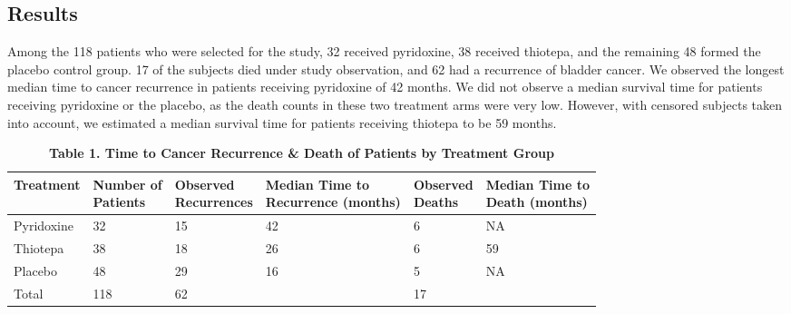 \documentclass{article}
\begin{document}
	\subsection*{Results}
	Among the 118 patients who were selected for the study, 32 received pyridoxine, 38 received thiotepa, and the remaining 48 formed the placebo control group. 17 of the subjects died under study observation, and 62 had a recurrence of bladder cancer. We observed the longest median time to cancer recurrence in patients receiving pyridoxine of 42 months. We did not observe a median survival time for patients receiving pyridoxine or the placebo, as the death counts in these two treatment arms were very low. However, with censored subjects taken into account, we estimated a median survival time for patients receiving thiotepa to be 59 months.

	\begin{table}[ht]
		\centering
		\footnotesize
		\caption*{\textbf{Table 1. Time to Cancer Recurrence \& Death of Patients by Treatment Group}}
		\begin{tabular}{@{}l l | l l | l l @{}}
			\toprule
			Treatment & \parbox[t]{2cm}{Number of\\ Patients} & \parbox[t]{2.5cm}{Observed\\ Recurrences} & \parbox[t]{3cm}{Median Time to\\ Recurrence (months)} & \parbox[t]{2.5cm}{Observed\\ Deaths} & \parbox[t]{3cm}{Median Time to\\ Death (months)} \\
			\midrule
			Pyridoxine & 32 & 15 & 42 & 6 & NA \\
			Thiotepa   & 38 & 18 & 26 & 6 & 59 \\
			Placebo    & 48 & 29 & 16 & 5 & NA \\
			\midrule
			Total      & 118 & 62 & & 17 & \\
			\bottomrule
		\end{tabular}
	\end{table}
\end{document}
